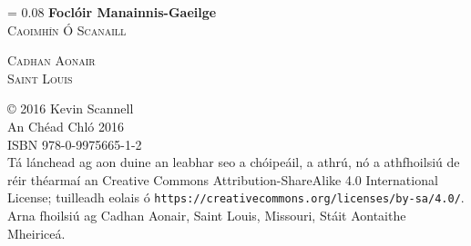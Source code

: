 \documentclass[8pt,twocolumn,openany]{extbook}
\newlength{\drop}
\newcommand*{\titleM}{\begingroup
\drop = 0.08\textheight
\centering
\vspace*{\drop}
{\Huge\bfseries Focl\'oir Manainnis-Gaeilge}\\[\baselineskip]
{\large\scshape Caoimh\'{\i}n \'O Scanaill}\par
\vfill
{\large\scshape Cadhan Aonair}\\[\baselineskip]
{\large\scshape Saint Louis}\par
\vspace*{2\drop}
\endgroup}
\begin{document}
\begin{frontmatter}
\pagestyle{empty}
\onecolumn
\titleM
\clearpage



\newpage

{\centering
\copyright \hspace{0.5ex} 2016 Kevin Scannell\\[\baselineskip]
An Chéad Chló 2016\\[\baselineskip]
ISBN 978-0-9975665-1-2\\[\baselineskip]
}
\vfill
\noindent
Tá lánchead ag aon duine an leabhar seo a chóipeáil, a athrú, nó a athfhoilsiú
de réir théarmaí an Creative Commons Attribution-ShareAlike 4.0 International
License; tuilleadh eolais ó 
\texttt{https://creativecommons.org/licenses/by-sa/4.0/}.\\[\baselineskip]
\noindent
Arna fhoilsiú ag Cadhan Aonair, Saint Louis, Missouri, Stáit Aontaithe Mheiriceá.



\end{frontmatter}
\end{document}
